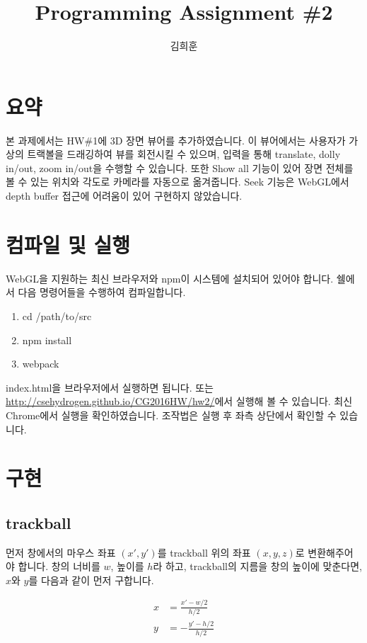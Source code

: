 \documentclass[11pt]{article}
\begin{document}
\title{Programming Assignment \#2}
\author{김희훈}
\maketitle

\section{요약}

본 과제에서는 HW\#1에 3D 장면 뷰어를 추가하였습니다.
이 뷰어에서는 사용자가 가상의 트랙볼을 드래깅하여 뷰를 회전시킬 수 있으며, 입력을 통해 translate, dolly in/out, zoom in/out을 수행할 수 있습니다.
또한 Show all 기능이 있어 장면 전체를 볼 수 있는 위치와 각도로 카메라를 자동으로 옮겨줍니다.
Seek 기능은 WebGL에서 depth buffer 접근에 어려움이 있어 구현하지 않았습니다.

\section{컴파일 및 실행}

WebGL을 지원하는 최신 브라우저와 npm이 시스템에 설치되어 있어야 합니다.
쉘에서 다음 명령어들을 수행하여 컴파일합니다.

\begin{enumerate}
  \item cd /path/to/src
  \item npm install
  \item webpack
\end{enumerate}

index.html을 브라우저에서 실행하면 됩니다.
또는 \url{http://csehydrogen.github.io/CG2016HW/hw2/}에서 실행해 볼 수 있습니다.
최신 Chrome에서 실행을 확인하였습니다.
조작법은 실행 후 좌측 상단에서 확인할 수 있습니다.

\section{구현}

\subsection{trackball}

먼저 창에서의 마우스 좌표 $(x', y')$를 trackball 위의 좌표 $(x, y, z)$로 변환해주어야 합니다.
창의 너비를 $w$, 높이를 $h$라 하고, trackball의 지름을 창의 높이에 맞춘다면, $x$와 $y$를 다음과 같이 먼저 구합니다.

\begin{align*}
  x &= \frac{x' - w / 2}{h / 2}\\
  y &= -\frac{y' - h / 2}{h / 2}
\end{align*}
\end{document}

